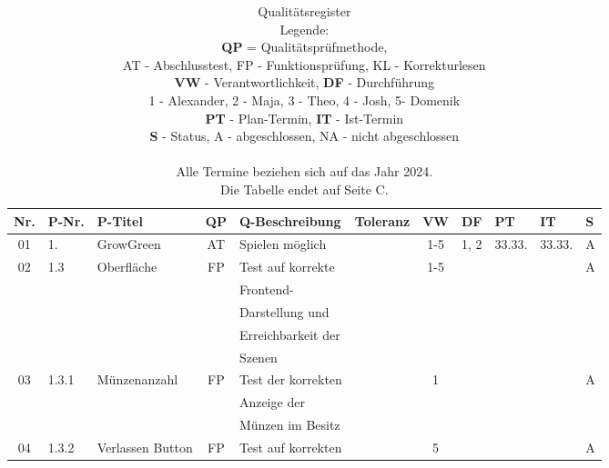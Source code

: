 \label{ch:anhang}
\footnotesize
\begin{longtable}{|c|l|l|c|l|l|c|c|l|l|l|}
    \caption[Qualitätsregister]{Qualitätsregister \\ Legende: \\
            \textbf{QP} = Qualitätsprüfmethode, \\
            AT - Abschlusstest, FP - Funktionsprüfung, KL - Korrekturlesen \\
            \textbf{VW} - Verantwortlichkeit, \textbf{DF} - Durchführung\\
            1 - Alexander, 2 - Maja, 3 - Theo, 4 - Josh, 5- Domenik \\
            \textbf{PT} - Plan-Termin, \textbf{IT} - Ist-Termin\\
            \textbf{S} - Status, A - abgeschlossen, NA - nicht abgeschlossen \\\\
            Alle Termine beziehen sich auf das Jahr 2024.\\
            Die Tabelle endet auf Seite C.\\}
    \label{tab:quality}\\
            \hline
            Nr. & P-Nr. & P-Titel & QP & Q-Beschreibung & Toleranz & VW & DF & PT & IT & S \\[0.5ex]
            \hline\hline
            01 & 1. & GrowGreen & AT & Spielen möglich & & 1-5 & 1, 2 & 33.33. & 33.33. & A \\
            \hline
            02 & 1.3 & Oberfläche & FP & Test auf korrekte &  & 1-5 &  &  &  & A \\
               &       &            &    & Frontend- &   &   & & & &\\
               &       &            &    & Darstellung und &   &   & & & &\\
               &       &            &    & Erreichbarkeit der &   &   & & & &\\
               &       &            &    & Szenen &   &   & & & &\\
            \hline
            03 & 1.3.1 & Münzenanzahl & FP & Test der korrekten &  & 1 &  &  &  & A \\
            &       &            &    & Anzeige der &   &   & & & &\\
            &       &            &    & Münzen im Besitz &   &   & & & &\\
            \hline
            04 & 1.3.2 & Verlassen Button & FP & Test auf korrekten &  & 5 &  &  &  & A \\

\end{longtable}
